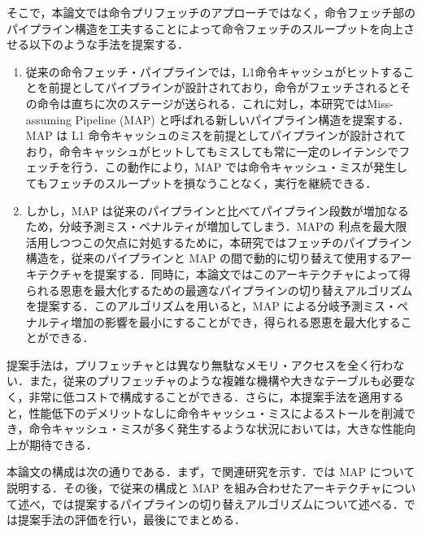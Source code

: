 そこで，本論文では命令プリフェッチのアプローチではなく，命令フェッチ部のパイプライン構造を工夫することによって命令フェッチのスループットを向上させる以下のような手法を提案する．
\begin{enumerate}
  \item 従来の命令フェッチ・パイプラインでは，L1命令キャッシュがヒットすることを前提としてパイプラインが設計されており，命令がフェッチされるとその命令は直ちに次のステージが送られる．これに対し，本研究ではMiss-assuming Pipeline (MAP) と呼ばれる新しいパイプライン構造を提案する．MAP は L1 命令キャッシュのミスを前提としてパイプラインが設計されており，命令キャッシュがヒットしてもミスしても常に一定のレイテンシでフェッチを行う．この動作により，MAP では命令キャッシュ・ミスが発生してもフェッチのスループットを損なうことなく，実行を継続できる．
  \item しかし，MAP は従来のパイプラインと比べてパイプライン段数が増加なるため，分岐予測ミス・ペナルティが増加してしまう．MAPの 利点を最大限活用しつつこの欠点に対処するために，本研究ではフェッチのパイプライン構造を，従来のパイプラインと MAP の間で動的に切り替えて使用するアーキテクチャを提案する．同時に，本論文ではこのアーキテクチャによって得られる恩恵を最大化するための最適なパイプラインの切り替えアルゴリズムを提案する．このアルゴリズムを用いると，MAP による分岐予測ミス・ペナルティ増加の影響を最小にすることができ，得られる恩恵を最大化することができる．
\end{enumerate}

提案手法は，プリフェッチャとは異なり無駄なメモリ・アクセスを全く行わない．また，従来のプリフェッチャのような複雑な機構や大きなテーブルも必要なく，非常に低コストで構成することができる．さらに，本提案手法を適用すると，性能低下のデメリットなしに命令キャッシュ・ミスによるストールを削減でき，命令キャッシュ・ミスが多く発生するような状況においては，大きな性能向上が期待できる．

本論文の構成は次の通りである．まず，で関連研究を示す．では MAP について説明する．その後，で従来の構成と MAP を組み合わせたアーキテクチャについて述べ，では提案するパイプラインの切り替えアルゴリズムについて述べる．では提案手法の評価を行い，最後にでまとめる．


